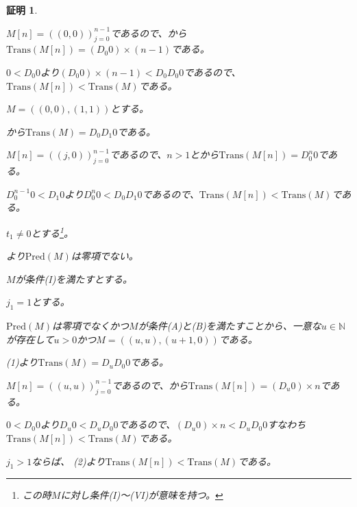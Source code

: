 \documentclass[dvipdfmx,uplatex]{jsarticle}
\theoremstyle{customnonumberbreakfortheorem}
\theoremstyle{customnonumberbreakforproof}
\newtheorem{hideableproof}{証明}
\begin{document}
\begin{hideableproof}
\begin{indented}
\begin{indented}
\begin{indented}
				\item \(M[n] = ((0,0))_{j=0}^{n-1}\)であるので、から\(\textrm{Trans}(M[n]) = (D_0 0) \times (n-1)\)である。
				\item \(0 < D_0 0\)より\((D_0 0) \times (n-1) < D_0 D_0 0\)であるので、\(\textrm{Trans}(M[n]) < \textrm{Trans}(M)\)である。
			\end{indented}
			\item \(M = ((0,0),(1,1))\)とする。
			\begin{indented}
				\item {}から\(\textrm{Trans}(M) = D_0 D_1 0\)である。
				\item \(M[n] = ((j,0))_{j=0}^{n-1}\)であるので、\(n > 1\)とから\(\textrm{Trans}(M[n]) = D_0^n 0\)である。
				\item \(D_0^{n-1} 0 < D_1 0\)より\(D_0^n 0 < D_0 D_1 0\)であるので、\(\textrm{Trans}(M[n]) < \textrm{Trans}(M)\)である。
			\end{indented}
		\end{indented}
		\item \(t_1 \neq 0\)とする\footnote{この時\(M\)に対し条件(I)～(VI)が意味を持つ。}。
		\item {}より\(\textrm{Pred}(M)\)は零項でない。
		\item \(M\)が条件(I)を満たすとする。
		\begin{indented}
			\item \(j_1 = 1\)とする。
			\begin{indented}
				\item \(\textrm{Pred}(M)\)は零項でなくかつ\(M\)が条件(A)と(B)を満たすことから、一意な\(u \in \mathbb{N}\)が存在して\(u > 0\)かつ\(M = ((u,u),(u+1,0))\)である。
				\item {} (1)より\(\textrm{Trans}(M) = D_u D_0 0\)である。
				\item \(M[n] = ((u,u))_{j=0}^{n-1}\)であるので、から\(\textrm{Trans}(M[n]) = (D_u 0) \times n\)である。
				\item \(0 < D_0 0\)より\(D_u 0 < D_u D_0 0\)であるので、\((D_u 0) \times n < D_u D_0 0\)すなわち\(\textrm{Trans}(M[n]) < \textrm{Trans}(M)\)である。
			\end{indented}
			\item \(j_1 > 1\)ならば、 (2)より\(\textrm{Trans}(M[n]) < \textrm{Trans}(M)\)である。

\end{indented}
\end{indented}
\end{hideableproof}
\end{document}
